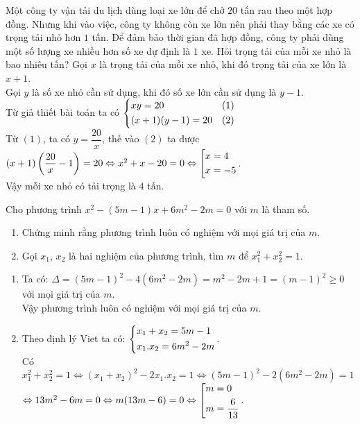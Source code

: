 \begin{ex}%
   Một công ty vận tải du lịch dùng loại xe lớn để chở $20$ tấn rau theo một hợp đồng. Nhưng khi vào việc, công ty không còn xe lớn nên phải thay bằng các xe có trọng tải nhỏ hơn $1$ tấn. Để đảm bảo thời gian đã hợp đồng, công ty phải dùng một số lượng xe nhiều hơn số xe dự định là $1$ xe. Hỏi trọng tải của mỗi xe nhỏ là bao nhiêu tấn?
\loigiai
    {Gọi $x$ là trọng tải của mỗi xe nhỏ, khi đó trọng tải của xe lớn là $x+1$.\\
    Gọi $y$ là số xe nhỏ cần sử dụng, khi đó số xe lớn cần sử dụng là $y-1$.\\
    Từ giả thiết bài toán ta có $\left\{\begin{aligned}&xy=20&(1)\\&(x+1)(y-1)=20&(2)\end{aligned}\right.$\\
    Từ $(1)$, ta có $y=\dfrac{20}{x}$, thế vào $(2)$ ta được $(x+1)\left(\dfrac{20}{x}-1\right)=20\Leftrightarrow x^2+x-20=0\Leftrightarrow\left[\begin{aligned}&x=4\\&x=-5\end{aligned}\right.$.\\
    Vậy mỗi xe nhỏ có tải trọng là $4$ tấn.
    }
\end{ex}

\begin{ex}%
Cho phương trình $x^2-(5m-1)x+6m^2-2m=0$ với $m$ là tham số.
\begin{enumerate}
	\item Chứng minh rằng phương trình luôn có nghiệm với mọi giá trị của $m$.
	\item Gọi $x_1$, $x_2$ là hai nghiệm của phương trình, tìm $m$ để $x_1^2+x_2^2=1$.
\end{enumerate}
\loigiai
    {\begin{enumerate}
        \item Ta có: $\Delta=(5m-1)^2-4(6m^2-2m)=m^2-2m+1=(m-1)^2\ge0$ với mọi giá trị của $m$.\\
        Vậy phương trình luôn có nghiệm với mọi giá trị của $m$.
        \item Theo định lý Viet ta có: $\left\{\begin{aligned}&x_1+x_2=5m-1\\&x_1.x_2=6m^2-2m\end{aligned}\right.$.\\
        Có $x_1^2+x_2^2=1\Leftrightarrow(x_1+x_2)^2-2x_1.x_2=1\Leftrightarrow(5m-1)^2-2(6m^2-2m)=1$\\
        $\Leftrightarrow 13m^2-6m=0\Leftrightarrow m(13m-6)=0\Leftrightarrow\left[\begin{aligned}&m=0\\&m=\dfrac{6}{13}\end{aligned}\right.$.
    \end{enumerate}}
\end{ex}

